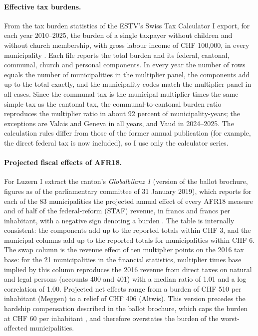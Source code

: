 \documentclass[11pt,a4paper]{article}
\begin{document}
\paragraph{Effective tax burdens.} From the tax burden statistics of the ESTV's Swiss Tax Calculator I export, for each year 2010--2025, the burden of a single taxpayer without children and without church membership, with gross labour income of CHF 100,000, in every municipality \citep{ESTV2026}. Each file reports the total burden and its federal, cantonal, communal, church and personal components. In every year the number of rows equals the number of municipalities in the multiplier panel, the components add up to the total exactly, and the municipality codes match the multiplier panel in all cases. Since the communal tax is the municipal multiplier times the same simple tax as the cantonal tax, the communal-to-cantonal burden ratio reproduces the multiplier ratio in about 92 percent of municipality-years; the exceptions are Valais and Geneva in all years, and Vaud in 2024--2025. The calculation rules differ from those of the former annual publication (for example, the direct federal tax is now included), so I use only the calculator series.

\paragraph{Projected fiscal effects of AFR18.} For Luzern I extract the canton's \emph{Globalbilanz 1} (version of the ballot brochure, figures as of the parliamentary committee of 31 January 2019), which reports for each of the 83 municipalities the projected annual effect of every AFR18 measure and of half of the federal-reform (STAF) revenue, in francs and francs per inhabitant, with a negative sign denoting a burden \citep{GlobalbilanzLU2019}. The table is internally consistent: the components add up to the reported totals within CHF 3, and the municipal columns add up to the reported totals for municipalities within CHF 6. The swap column is the revenue effect of ten multiplier points on the 2016 tax base: for the 21 municipalities in the financial statistics, multiplier times base implied by this column reproduces the 2016 revenue from direct taxes on natural and legal persons (accounts 400 and 401) with a median ratio of 1.01 and a log correlation of 1.00. Projected net effects range from a burden of CHF 510 per inhabitant (Meggen) to a relief of CHF 406 (Altwis). This version precedes the hardship compensation described in the ballot brochure, which caps the burden at CHF 60 per inhabitant \citep{KantonLU2019}, and therefore overstates the burden of the worst-affected municipalities.
\end{document}
